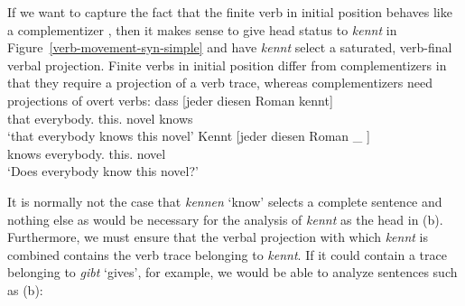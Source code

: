 If we want to capture the fact that the finite verb in initial position behaves like a
complementizer \citep{Hoehle97a}, then it makes sense to give head status to
\emph{kennt} in Figure~\ref{verb-movement-syn-simple} and have \emph{kennt} select a saturated,
verb-final verbal projection. Finite verbs in initial position differ from complementizers in that
they require a projection of a verb trace, whereas complementizers need projections of overt verbs:
\eal
\ex 
\gll dass [jeder diesen Roman kennt]\\
     that \spacebr{}everybody.\NOM{} this.\ACC{} novel knows\\
\glt `that everybody knows this novel'
\ex 
\gll Kennt [jeder diesen Roman \_ ]\\
	 knows \spacebr{}everybody.\NOM{} this.\ACC{} novel\\
\glt `Does everybody know this novel?'
\zl

\addlines[2]
\noindent
It is normally not the case that \emph{kennen} `know' selects a complete sentence and nothing else as would be necessary for the analysis of 
\emph{kennt} as the head in (b). Furthermore, we must ensure that the verbal projection with which \emph{kennt} is combined contains the verb trace belonging to
\emph{kennt}. If it could contain a trace belonging to \emph{gibt} `gives', for example, we would be able to analyze sentences such as (b):
\eal
{}
\zl

